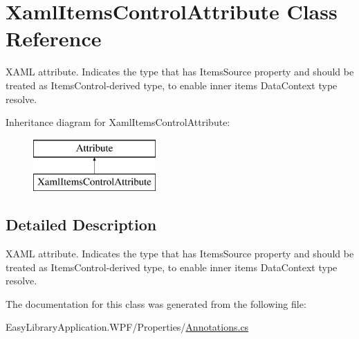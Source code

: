 \hypertarget{class_xaml_items_control_attribute}{}\section{Xaml\+Items\+Control\+Attribute Class Reference}
\label{class_xaml_items_control_attribute}


X\+A\+ML attribute. Indicates the type that has {\ttfamily Items\+Source} property and should be treated as {\ttfamily Items\+Control}-\/derived type, to enable inner items {\ttfamily Data\+Context} type resolve.  


Inheritance diagram for Xaml\+Items\+Control\+Attribute\+:\begin{figure}[H]
\begin{center}
\leavevmode
\includegraphics[height=2.000000cm]{class_xaml_items_control_attribute}
\end{center}
\end{figure}


\subsection{Detailed Description}
X\+A\+ML attribute. Indicates the type that has {\ttfamily Items\+Source} property and should be treated as {\ttfamily Items\+Control}-\/derived type, to enable inner items {\ttfamily Data\+Context} type resolve. 



The documentation for this class was generated from the following file\+:\begin{DoxyCompactItemize}
\item 
Easy\+Library\+Application.\+W\+P\+F/\+Properties/\mbox{\hyperlink{_annotations_8cs}{Annotations.\+cs}}\end{DoxyCompactItemize}
